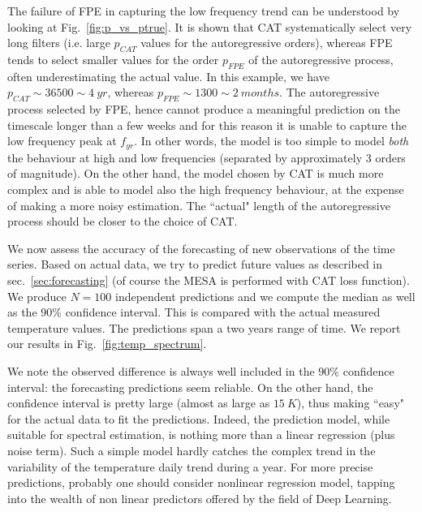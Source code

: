 \documentclass[twocolumn,showpacs,preprintnumbers,nofootinbib,prd,
superscriptaddress,10pt]{revtex4-1}
\begin{document}
The failure of FPE in capturing the low frequency trend can be understood by looking at Fig.~\ref{fig:p_vs_ptrue}. It is shown that CAT systematically select very long filters (i.e. large $p_{CAT}$ values for the autoregressive orders), whereas FPE tends to select smaller values for the order $p_{FPE}$ of the autoregressive process, often underestimating the actual value.
In this example, we have $p_{CAT} \sim  36500 \sim  \SI{4}{yr}$, whereas $p_{FPE} \sim  1300 \sim  \SI{2}{months}$.
The autoregressive process selected by FPE, hence cannot produce a meaningful prediction on the timescale longer than a few weeks and for this reason it is unable to capture the low frequency peak at $f_{yr}$. In other words, the model is too simple to model \textit{both} the behaviour at high and low frequencies (separated by approximately 3 orders of magnitude).
On the other hand, the model chosen by CAT is much more complex and is able to model also the high frequency behaviour, at the expense of making a more noisy estimation.
The ``actual" length of the autoregressive process should be closer to the choice of CAT.

We now assess the accuracy of the forecasting of new observations of the time series. 
Based on actual data, we try to predict future values as described in sec.~\ref{sec:forecasting} (of course the MESA is performed with CAT loss function). We produce $N =100$ independent predictions and we compute the median as well as the $90\%$ confidence interval. This is compared with the actual measured temperature values. The predictions span a two years range of time. We report our results in Fig.~\ref{fig:temp_spectrum}.

We note the observed difference is always well included in the $90\%$ confidence interval: the forecasting predictions seem reliable.
On the other hand, the confidence interval is pretty large (almost as large as $\SI{15}{K}$), thus making ``easy" for the actual data to fit the predictions.
Indeed, the prediction model, while suitable for spectral estimation, is nothing more than a linear regression (plus noise term). Such a simple model hardly catches the complex trend in the variability of the temperature daily trend during a year. For more precise predictions, probably one should consider nonlinear regression model, tapping into the wealth of non linear predictors offered by the field of Deep Learning.
\end{document}
